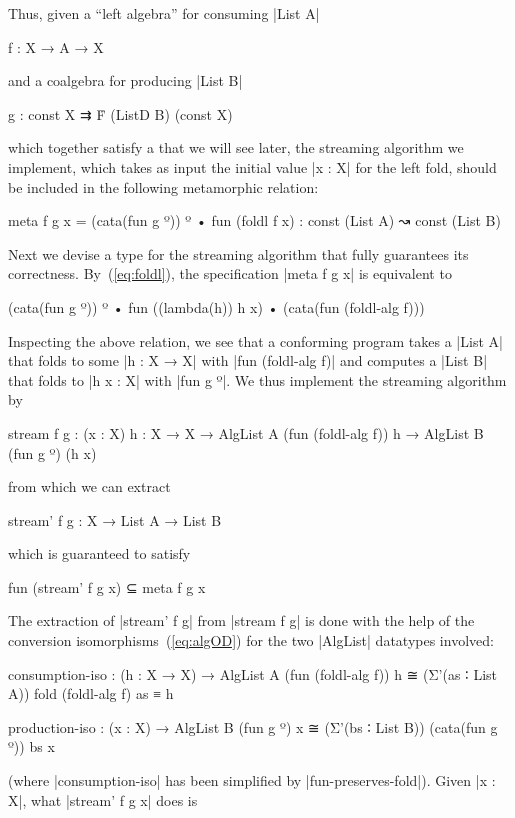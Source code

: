 Thus, given a ``left algebra'' for consuming |List A|
\begin{code}
f : X → A → X
\end{code}
and a coalgebra for producing |List B|
\begin{code}
g : const X ⇉ Ḟ (ListD B) (const X)
\end{code}
which together satisfy a  that we will see later, the streaming algorithm we implement, which takes as input the initial value |x : X| for the left fold, should be included in the following metamorphic relation:
\begin{code}
meta f g x = (cata(fun g º)) º • fun (foldl f x) : const (List A) ↝ const (List B)
\end{code}

Next we devise a type for the streaming algorithm that fully guarantees its correctness.
 By~(\ref{eq:foldl}), the specification |meta f g x| is equivalent to
\begin{code}
(cata(fun g º)) º • fun ((lambda(h)) h x) • (cata(fun (foldl-alg f)))
\end{code}
Inspecting the above relation, we see that a conforming program takes a |List A| that folds to some |h : X → X| with |fun (foldl-alg f)| and computes a |List B| that folds to |h x : X| with |fun g º|.
We thus implement the streaming algorithm by
\begin{code}
stream f g :  (x : X) {h : X → X} →
              AlgList A (fun (foldl-alg f)) h → AlgList B (fun g º) (h x)
\end{code}
from which we can extract
\begin{code}
stream' f g : X → List A → List B
\end{code}
which is guaranteed to satisfy
\begin{code}
fun (stream' f g x)  ⊆ meta f g x
\end{code}
The extraction of |stream' f g| from |stream f g| is done with the help of the conversion isomorphisms~(\ref{eq:algOD}) for the two |AlgList| datatypes involved:
\begin{code}
consumption-iso :
  (h : X → X) →
  AlgList A (fun (foldl-alg f)) h ≅ (Σ'(as ∶ List A)) fold (foldl-alg f) as ≡ h

production-iso :
  (x : X) → AlgList B (fun g º) x ≅ (Σ'(bs ∶ List B)) (cata(fun g º)) bs x
\end{code}
(where |consumption-iso| has been simplified by |fun-preserves-fold|).
Given |x : X|, what |stream' f g x| does is
